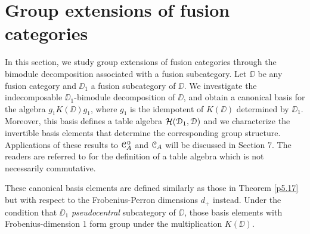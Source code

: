 \documentclass{amsart}
\begin{document}
\section{Group extensions of fusion categories}

In this section, we study group extensions of fusion categories through the bimodule decomposition associated with a fusion subcategory. Let $\DD$ be any fusion category and $\DD_1$ a fusion subcategory of $\DD$. We investigate the indecomposable $\DD_1$-bimodule decomposition of $\DD$, and obtain a canonical basis for the algebra $g_1 K(\DD) g_1$, where $g_1$ is the idempotent of $K(\DD)$ determined by $\DD_1$. Moreover, this basis defines a table algebra $\mathcal{H}({\EuScript{D}}_1, {\EuScript{D}})$ and we characterize the invertible basis elements that determine the corresponding group structure. Applications of these results to 
${{\EuScript{C}}_A^{\hspace{1pt}0}}$ and ${{\EuScript{C}}_A}$ will be discussed in Section 7.  The readers are referred to \cite{AB, AFM} for the definition of a table algebra which is not necessarily commutative.


These canonical basis elements are defined similarly as those in Theorem \ref{p5.17} but with respect to the Frobenius-Perron dimensions $d_+$ instead. Under the condition that $\DD_1$ \emph{pseudocentral} subcategory of $\DD$, those basis elements with Frobenius-dimension 1 form group under the multiplication $K(\DD)$.
\end{document}
